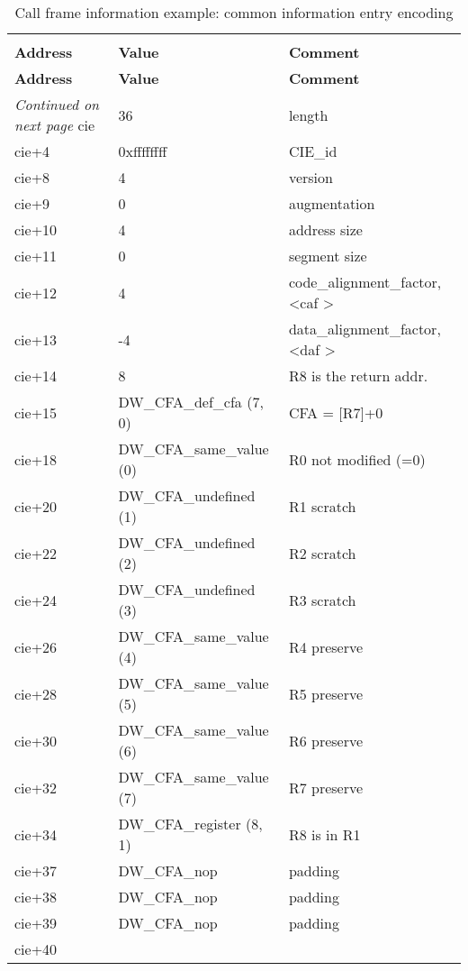 \begin{centering}
\setlength{\extrarowheight}{0.1cm}
\begin{longtable}{lll}
  \caption{Call frame information example: common information entry encoding} \label{tab:callframeinformationexamplecommoninformationentryencoding} \\
  \hline \\ \bfseries Address &\bfseries Value &\bfseries Comment \\ \hline
\endfirsthead
  \bfseries Address &\bfseries Value &\bfseries Comment \\ \hline
\endhead
  \hline \emph{Continued on next page}
\endfoot
  \hline
\endlastfoot
cie&36&length    \\
cie+4&0xffffffff&CIE\_id    \\
cie+8&4&version    \\
cie+9&0&augmentation     \\
cie+10&4&address size    \\
cie+11&0&segment size    \\
cie+12&4&code\_alignment\_factor, \textless caf \textgreater    \\
cie+13&-4&data\_alignment\_factor, \textless daf \textgreater    \\
cie+14&8&R8 is the return addr.    \\
cie+15&DW\-\_CFA\-\_def\-\_cfa (7, 0)&CFA = [R7]+0    \\
cie+18&DW\-\_CFA\-\_same\-\_value (0)&R0 not modified (=0)    \\
cie+20&DW\-\_CFA\-\_undefined (1)&R1 scratch    \\
cie+22&DW\-\_CFA\-\_undefined (2)&R2 scratch    \\
cie+24&DW\-\_CFA\-\_undefined (3)&R3 scratch    \\
cie+26&DW\-\_CFA\-\_same\-\_value (4)&R4 preserve    \\
cie+28&DW\-\_CFA\-\_same\-\_value (5)&R5 preserve    \\
cie+30&DW\-\_CFA\-\_same\-\_value (6)&R6 preserve    \\
cie+32&DW\-\_CFA\-\_same\-\_value (7)&R7 preserve    \\
cie+34&DW\-\_CFA\-\_register (8, 1)&R8 is in R1    \\
cie+37&DW\-\_CFA\-\_nop&padding    \\
cie+38&DW\-\_CFA\-\_nop& padding \\
cie+39& DW\-\_CFA\-\_nop&padding  \\
cie+40 &&  \\
\end{longtable}
\end{centering}


